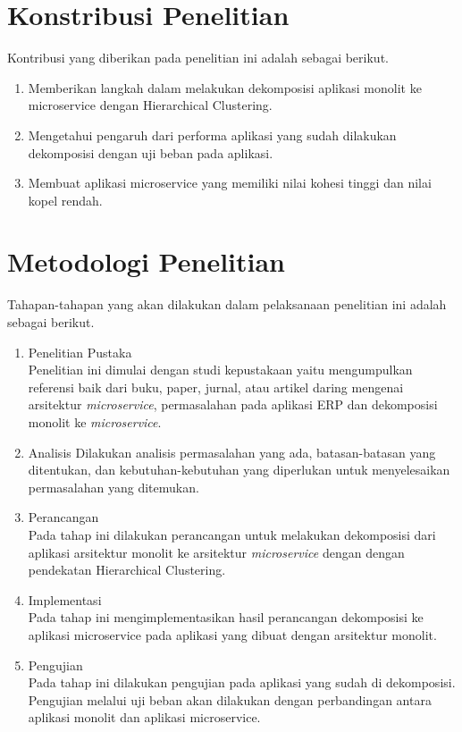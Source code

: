 \section{Konstribusi Penelitian}
Kontribusi yang diberikan pada penelitian ini adalah sebagai berikut.
\begin{enumerate}[nolistsep,leftmargin=0.5cm]
  \item Memberikan langkah dalam melakukan dekomposisi aplikasi monolit ke microservice dengan Hierarchical Clustering.
  \item Mengetahui pengaruh dari performa aplikasi yang sudah dilakukan dekomposisi dengan uji beban pada aplikasi.
  \item Membuat aplikasi microservice yang memiliki nilai kohesi tinggi dan nilai kopel rendah.
\end{enumerate}

\section{Metodologi Penelitian}
Tahapan-tahapan yang akan dilakukan dalam pelaksanaan penelitian ini adalah sebagai berikut.
\begin{enumerate}[nolistsep,leftmargin=0.5cm]
  \item Penelitian Pustaka \\
  Penelitian ini dimulai dengan studi kepustakaan yaitu mengumpulkan referensi baik dari buku, paper, jurnal, atau artikel daring mengenai arsitektur \textit{microservice}, permasalahan pada aplikasi ERP dan dekomposisi monolit ke \textit{microservice}.
  \item Analisis
  Dilakukan analisis permasalahan yang ada, batasan-batasan yang ditentukan, dan  kebutuhan-kebutuhan yang diperlukan untuk menyelesaikan permasalahan yang ditemukan.
  \item Perancangan \\
  Pada tahap ini dilakukan perancangan untuk melakukan dekomposisi dari aplikasi arsitektur monolit ke arsitektur \textit{microservice} dengan dengan pendekatan Hierarchical Clustering.
  \item Implementasi \\
  Pada tahap ini mengimplementasikan hasil perancangan dekomposisi ke aplikasi microservice pada aplikasi yang dibuat dengan arsitektur monolit.
  \item Pengujian \\
  Pada tahap ini  dilakukan pengujian pada aplikasi yang sudah di dekomposisi. Pengujian melalui uji beban akan dilakukan dengan perbandingan antara aplikasi monolit dan aplikasi microservice.\\ 
\end{enumerate}

